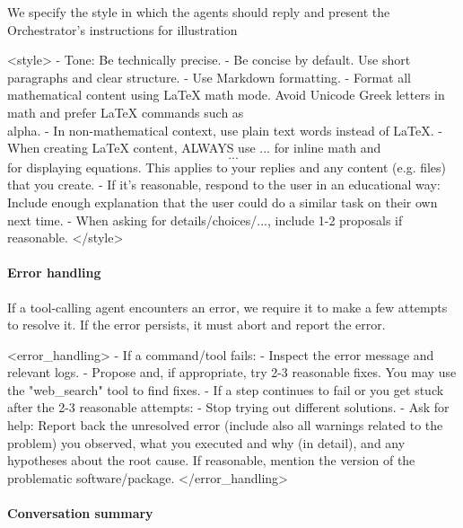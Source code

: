 \documentclass[submission, Phys]{SciPost}
\begin{document}
We specify the style in which the agents should reply and present the Orchestrator's instructions for illustration
%
\begin{promptblocklit}
<style>
- Tone: Be technically precise.
- Be concise by default. Use short paragraphs and clear structure.
- Use Markdown formatting.
- Format all mathematical content using LaTeX math mode. Avoid Unicode Greek letters in math and prefer LaTeX commands such as \\alpha.
- In non-mathematical context, use plain text words instead of LaTeX.
- When creating LaTeX content, ALWAYS use $...$ for inline math and $$...$$ for displaying equations. This applies to your replies and any content (e.g. files) that you create.
- If it's reasonable, respond to the user in an educational way: Include enough explanation that the user could do a similar task on their own next time.
- When asking for details/choices/..., include 1-2 proposals if reasonable.
</style>
\end{promptblocklit}

\paragraph{Error handling}

If a tool-calling agent encounters an error, we require it to make a few attempts to resolve it. If the error persists, it must abort and report the error.
%
\begin{promptblocklit}
<error_handling>
- If a command/tool fails:
  - Inspect the error message and relevant logs.
  - Propose and, if appropriate, try 2-3 reasonable fixes. You may use the "web_search" tool to find fixes.
- If a step continues to fail or you get stuck after the 2-3 reasonable attempts:
  - Stop trying out different solutions.
  - Ask for help: Report back the unresolved error (include also all warnings related to the problem) you observed, what you executed and why (in detail), and any hypotheses about the root cause. If reasonable, mention the version of the problematic software/package.
</error_handling>
\end{promptblocklit}

\paragraph{Conversation summary}
\end{document}
